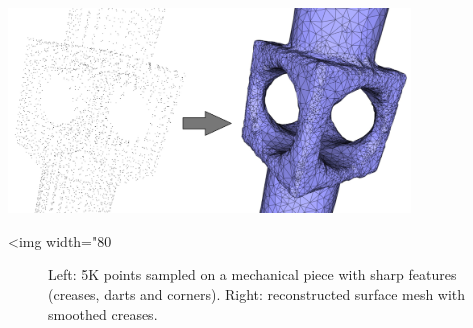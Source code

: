 \begin{center}
    \label{Surface_reconstruction_points_3-fig-sharp_features}
    \begin{ccTexOnly}
\includegraphics[width=0.8\textwidth]{Surface_reconstruction_points_3/sharp_features}
    \end{ccTexOnly}
    \begin{ccHtmlOnly}
        <img width="80%
    \end{ccHtmlOnly}
    \begin{figure}[h]
        \caption{Left: 5K points sampled on a mechanical piece with
                 sharp features (creases, darts and corners).
                 Right: reconstructed surface mesh with smoothed
                 creases.}
    \end{figure}
\end{center}




